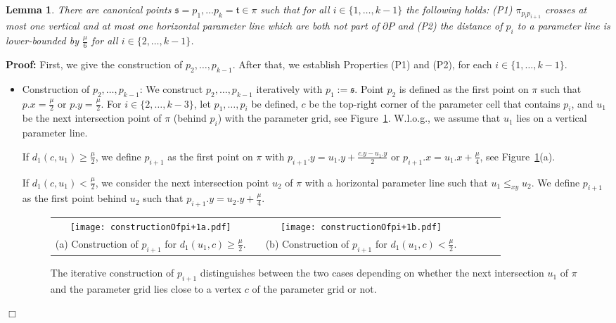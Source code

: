 \documentclass[a4paper,11pt]{article}
\newtheorem{lemma}{Lemma}
\newenvironment{proof}{\textbf{Proof:}}{\hspace*{0mm}\hfill\ensuremath{\Box}}
\begin{document}
\begin{lemma}\label{lem:separatingPoints}
	There are canonical points $\mathfrak{s} = p_1,\dots p_k = \mathfrak{t} \in \pi$ such that for all $i \in \{ 1,\dots,k-1 \}$ the following holds: (P1) $\pi_{p_{i}p_{i+1}}$ crosses at most one vertical and at most one horizontal parameter line which are both not part of $\partial P$ and (P2) the distance of $p_i$ to a parameter line is lower-bounded by $\frac{\mu}{6}$ for all $i \in \{ 2,\dots,k-1 \}$.
\end{lemma}
\begin{proof} First, we give the construction of $p_2,\dots,p_{k-1}$. After that, we establish Properties (P1) and  (P2), for each $i \in \{ 1,\dots,k-1 \}$.
\begin{itemize}
	\item Construction of $p_2,\dots,p_{k-1}$: We construct $p_2,\dots,p_{k-1}$ iteratively with $p_1 := \mathfrak{s}$. Point $p_2$ is defined as the first point on $\pi$ such that $p.x = \frac{\mu}{2}$ or $p.y = \frac{\mu}{2}$. For $i \in \{ 2,\dots,k-3 \}$, let $p_1,\dots,p_i$ be defined, $c$ be the top-right corner of the parameter cell that contains $p_{i}$, and $u_1$ be the next intersection point of $\pi$ (behind $p_i$) with the parameter grid, see Figure~\ref{fig:constructionSequenceCanonicalPoints}. W.l.o.g., we assume that $u_1$ lies on a vertical parameter line.
	
	If $d_1(c,u_1) \geq \frac{\mu}{2}$, we define $p_{i+1}$ as the first point on $\pi$ with $p_{i+1}.y = u_1.y + \frac{c.y-u_1.y}{2}$ or $p_{i+1}.x = u_1.x + \frac{\mu}{4}$, see Figure~\ref{fig:constructionSequenceCanonicalPoints}(a).
	
	If $d_1(c,u_1) < \frac{\mu}{2}$, we consider the next intersection point $u_2$ of $\pi$ with a horizontal parameter line such that $u_1 \leq_{xy} u_2$. We define $p_{i+1}$ as the first point behind $u_2$ such that $p_{i+1}.y = u_2.y + \frac{\mu}{4}$.
	
\begin{figure}[ht]
  \begin{center}
    \begin{tabular}{ccccccc}
      \texttt{[image: constructionOfpi+1a.pdf]} & &
       \texttt{[image: constructionOfpi+1b.pdf]}&&\\ 
{\small (a) Construction of $p_{i+1}$ for $d_1(u_1,c) \geq \frac{\mu}{2}$.} & &
      {\small (b) Construction of $p_{i+1}$ for $d_1(u_1,c) < \frac{\mu}{2}$.}&&
    \end{tabular}
  \end{center}
  \vspace*{-12pt}
  \caption{The iterative construction of $p_{i+1}$ distinguishes between the two cases depending on whether the next intersection $u_1$ of $\pi$ and the parameter grid lies close to a vertex $c$ of the parameter grid or not.}
  \label{fig:constructionSequenceCanonicalPoints}
\end{figure}


\end{itemize}
\end{proof}
\end{document}
